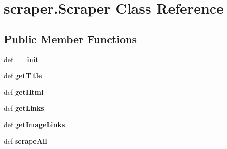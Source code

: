 \hypertarget{classscraper_1_1Scraper}{\section{scraper.\-Scraper Class Reference}
\label{classscraper_1_1Scraper}
}
\subsection*{Public Member Functions}
\begin{DoxyCompactItemize}
\item 
\hypertarget{classscraper_1_1Scraper_aab2046c61d81f97f4ca91f5d82a3e93b}{def {\bfseries \-\_\-\-\_\-init\-\_\-\-\_\-}}\label{classscraper_1_1Scraper_aab2046c61d81f97f4ca91f5d82a3e93b}

\item 
\hypertarget{classscraper_1_1Scraper_a1e363cf9112a9fab5c0de49b65a60ecf}{def {\bfseries get\-Title}}\label{classscraper_1_1Scraper_a1e363cf9112a9fab5c0de49b65a60ecf}

\item 
\hypertarget{classscraper_1_1Scraper_aa930865ef6567c2b8daf29295a9b61f5}{def {\bfseries get\-Html}}\label{classscraper_1_1Scraper_aa930865ef6567c2b8daf29295a9b61f5}

\item 
\hypertarget{classscraper_1_1Scraper_a83d540593a1fc58851432ad83b12992c}{def {\bfseries get\-Links}}\label{classscraper_1_1Scraper_a83d540593a1fc58851432ad83b12992c}

\item 
\hypertarget{classscraper_1_1Scraper_af9b594f2792b57580d7bc5aac581e85c}{def {\bfseries get\-Image\-Links}}\label{classscraper_1_1Scraper_af9b594f2792b57580d7bc5aac581e85c}

\item 
\hypertarget{classscraper_1_1Scraper_a1e5e5e16c03a9ee6709ed10da0dc75a1}{def {\bfseries scrape\-All}}\label{classscraper_1_1Scraper_a1e5e5e16c03a9ee6709ed10da0dc75a1}

\end{DoxyCompactItemize}
